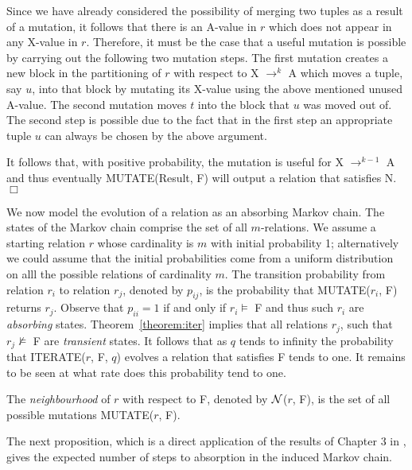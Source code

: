 Since we have already considered the possibility of merging two 
tuples as a result of a mutation, it follows that there
is an A-value in $r$ which does not appear in any X-value in $r$.
Therefore, it must be the case that a useful mutation is possible by 
carrying out the following two mutation steps.
The first mutation creates a new block in the partitioning of $r$ 
with respect to X $\to^k$ A which moves a tuple, say  $u$,
into that block by mutating its X-value using the above mentioned unused A-value.
The second mutation moves $t$ into the block that $u$ was moved out of.
The second step is possible due to the fact that in the first step 
an appropriate tuple $u$ can always be chosen by the above argument.

\smallskip

It follows that, with positive probability, 
the mutation is useful for X $\to^{k-1}$ A and thus
eventually MUTATE(Result, F) will output a relation that satisfies N.
\quad $\Box$
\medskip

We now model the evolution of a relation as an absorbing Markov chain.
The states of the Markov chain comprise the set of all $m$-relations.
We assume a starting relation $r$ whose cardinality is $m$
with initial probability 1;
alternatively we could assume that the initial probabilities
come from a uniform distribution on alll
the possible relations of cardinality $m$.
The transition probability from relation $r_i$ to relation $r_j$,
denoted by $p_{ij}$, is the probability that MUTATE($r_i$, F) returns $r_j$. 
Observe that $p_{ii} = 1$ if and only if $r_i \models$ F
and thus such $r_i$ are {\em absorbing} states. 
Theorem~\ref{theorem:iter} implies that all relations $r_j$, 
such that $r_j \not\models$ F are {\em transient} states.
It follows that as $q$ tends to infinity the probability that 
ITERATE($r$, F, $q$) evolves a relation that satisfies F tends to one.
It remains to be seen at what rate does this probability tend to one.


\begin{definition}\label{def:nhood}
\begin{rm}
The {\em neighbourhood} of $r$ with respect to F,
denoted by ${\cal N}$($r$, F),
is the set of all possible mutations MUTATE($r$, F).
\end{rm}
\end{definition}
\medskip

The next proposition, which is a direct application of the results of
Chapter 3 in \cite{ks60}, gives the expected number of steps to absorption
in the induced Markov chain.

